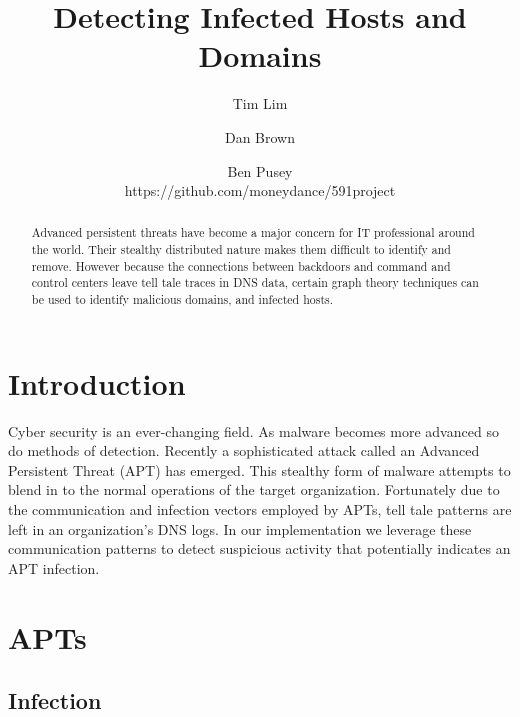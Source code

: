 \documentclass{article} %
\title{Detecting Infected Hosts and Domains}
\author{
Tim  Lim\\
\and
Dan Brown \\
\and
Ben Pusey \\
\AND
https://github.com/moneydance/591project
}
\begin{document}
\maketitle


\begin{abstract}
Advanced persistent threats have become a major concern for IT professional around the world. Their stealthy distributed nature makes them difficult 
to identify and remove. However because the connections between backdoors and command and control centers leave tell tale traces in DNS data, certain graph theory
techniques can be used to identify malicious domains, and infected hosts.
\end{abstract}

\section{Introduction}
Cyber security is an ever-changing field. As malware becomes more advanced so do methods of detection. Recently a sophisticated attack called an Advanced Persistent Threat (APT) has emerged. This stealthy form of malware attempts to blend in to the normal operations of the target organization. Fortunately due to the communication and infection vectors employed by APTs,  tell tale patterns are left in an organization's DNS logs. In our implementation we leverage these communication patterns to detect suspicious activity that potentially indicates an APT infection.





\section{APTs}

\subsection{Infection}
\end{document}
